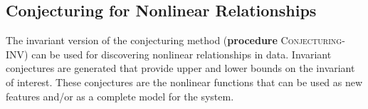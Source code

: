 \documentclass[ijds,nonblindrev]{informs-ijds}
\begin{document}
%

\subsection{Conjecturing for Nonlinear Relationships}
\label{regression}
The invariant version of the conjecturing method ({\bf procedure} \textsc{Conjecturing-INV}) can be used for discovering nonlinear relationships in data.  Invariant conjectures are generated that provide upper and lower bounds on the invariant of interest.  These conjectures are the nonlinear functions that can be used as new features and/or as a complete model for the system.  
\end{document}
